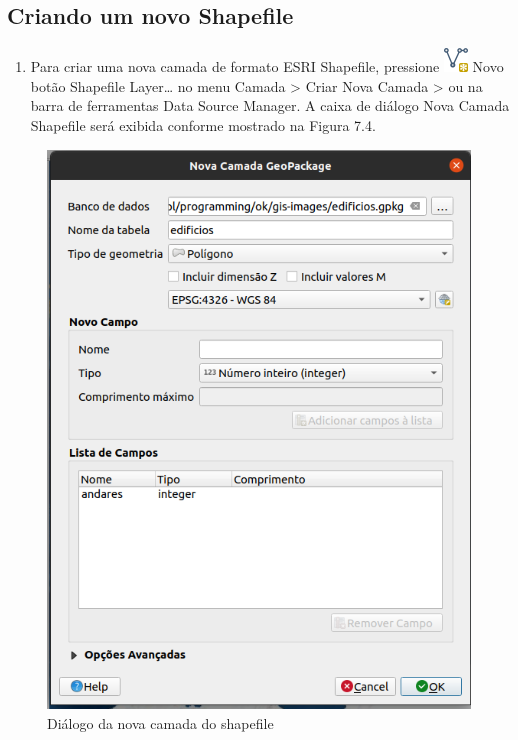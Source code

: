 \documentclass[
]{krantz}
\providecommand{\tightlist}{%
  \setlength{\itemsep}{0pt}\setlength{\parskip}{0pt}}
\begin{document}
\hypertarget{criando-um-novo-shapefile}{%
\subsection{Criando um novo Shapefile}\label{criando-um-novo-shapefile}}

\begin{enumerate}
\def\labelenumi{\arabic{enumi}.}
\tightlist
\item
  Para criar uma nova camada de formato ESRI Shapefile, pressione \includegraphics{media/modulo7/mActionNewVectorLayer.png} Novo botão Shapefile Layer\ldots{} no menu Camada \textgreater{} Criar Nova Camada \textgreater{} ou na barra de ferramentas Data Source Manager. A caixa de diálogo Nova Camada Shapefile será exibida conforme mostrado na Figura 7.4.
\end{enumerate}

\begin{figure}
\centering
\includegraphics{media/modulo7/new-shapefile-dialog.png}
\caption{Diálogo da nova camada do shapefile}
\end{figure}
\end{document}
